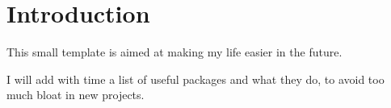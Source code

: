 \chapter{Introduction}
    This small template is aimed at making my life easier in the future.

    I will add with time a list of useful packages and what they do, to avoid too much bloat in new projects.